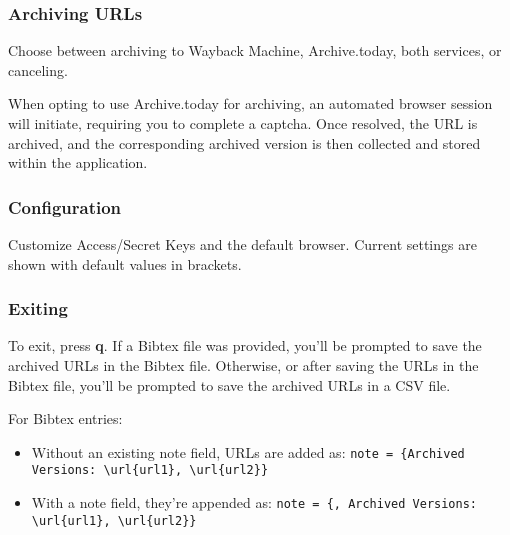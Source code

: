 \subsubsection{Archiving URLs}

Choose between archiving to Wayback Machine, Archive.today, both services, or canceling.

When opting to use Archive.today for archiving, an automated browser session will initiate, requiring you to complete a captcha. Once resolved, the URL is archived, and the corresponding archived version is then collected and stored within the application.

\subsubsection{Configuration}

Customize Access/Secret Keys and the default browser. Current settings are shown with default values in brackets.

\subsubsection{Exiting}

To exit, press \textbf{q}. If a Bibtex file was provided, you'll be prompted to save the archived URLs in the Bibtex file. Otherwise, or after saving the URLs in the Bibtex file, you'll be prompted to save the archived URLs in a CSV file.

For Bibtex entries:
\begin{itemize}
	\item Without an existing note field, URLs are added as: \texttt{note = \{Archived Versions: \textbackslash url\{url1\}, \textbackslash url\{url2\}\}}
	\item With a note field, they're appended as: \texttt{note = \{<current note>, Archived Versions: \textbackslash url\{url1\}, \textbackslash url\{url2\}\}}
\end{itemize}
